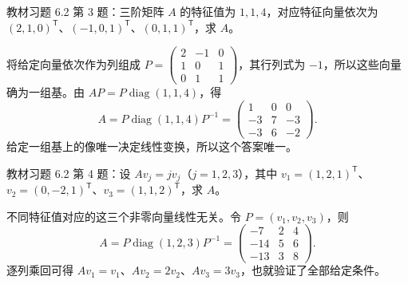 \begin{example}
\label{ex:xie-62-03}
教材习题 6.2 第 3 题：三阶矩阵 $A$ 的特征值为 $1,1,4$，对应特征向量依次为 $(2,1,0)^{\mathsf T}$、$(-1,0,1)^{\mathsf T}$、$(0,1,1)^{\mathsf T}$，求 $A$。
\end{example}
\begin{solve}
将给定向量依次作为列组成 $P=\begin{pmatrix}2&-1&0\\1&0&1\\0&1&1\end{pmatrix}$，其行列式为 $-1$，所以这些向量确为一组基。由 $AP=P\operatorname{diag}(1,1,4)$，得
\[
 A=P\operatorname{diag}(1,1,4)P^{-1}
 =\begin{pmatrix}1&0&0\\-3&7&-3\\-3&6&-2\end{pmatrix}.
\]
给定一组基上的像唯一决定线性变换，所以这个答案唯一。
\end{solve}

\begin{example}
\label{ex:xie-62-04}
教材习题 6.2 第 4 题：设 $Av_j=jv_j$（$j=1,2,3$），其中 $v_1=(1,2,1)^{\mathsf T}$、$v_2=(0,-2,1)^{\mathsf T}$、$v_3=(1,1,2)^{\mathsf T}$，求 $A$。
\end{example}
\begin{solve}
不同特征值对应的这三个非零向量线性无关。令 $P=(v_1,v_2,v_3)$，则
\[
 A=P\operatorname{diag}(1,2,3)P^{-1}
 =\begin{pmatrix}-7&2&4\\-14&5&6\\-13&3&8\end{pmatrix}.
\]
逐列乘回可得 $Av_1=v_1$、$Av_2=2v_2$、$Av_3=3v_3$，也就验证了全部给定条件。
\end{solve}

